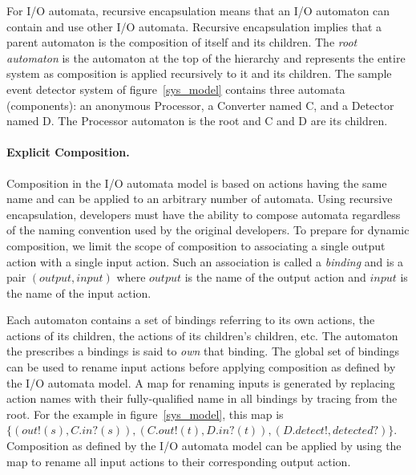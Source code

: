 For I/O automata, recursive encapsulation means that an I/O automaton can contain and use other I/O automata.
Recursive encapsulation implies that a parent automaton is the composition of itself and its children.
The \emph{root automaton} is the automaton at the top of the hierarchy and represents the entire system as composition is applied recursively to it and its children.
The sample event detector system of figure~\ref{sys_model} contains three automata (components):  an anonymous Processor, a Converter named C, and a Detector named D.
The Processor automaton is the root and C and D are its children.

\paragraph{Explicit Composition.}
Composition in the I/O automata model is based on actions having the same name and can be applied to an arbitrary number of automata.
Using recursive encapsulation, developers must have the ability to compose automata regardless of the naming convention used by the original developers.
To prepare for dynamic composition, we limit the scope of composition to associating a single output action with a single input action.
Such an association is called a \emph{binding} and is a pair $(output, input)$ where $output$ is the name of the output action and $input$ is the name of the input action.

Each automaton contains a set of bindings referring to its own actions, the actions of its children, the actions of its children's children, etc.
The automaton the prescribes a bindings is said to \emph{own} that binding.
The global set of bindings can be used to rename input actions before applying composition as defined by the I/O automata model.
A map for renaming inputs is generated by replacing action names with their fully-qualified name in all bindings by tracing from the root.
For the example in figure~\ref{sys_model}, this map is $\{ (out!(s), C.in?(s)), (C.out!(t), D.in?(t)), (D.detect!, detected?) \}$.
Composition as defined by the I/O automata model can be applied by using the map to rename all input actions to their corresponding output action.

